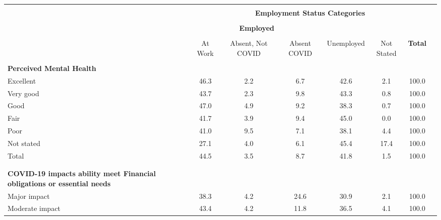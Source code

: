 \begin{tabular*}{\hsize}{ @{\extracolsep{\fill}}l*{7}{c}}
\hline\hline
\\
&\multicolumn{6}{c}{ \textbf{Employment Status Categories} } \\
\cline{2-7} \\
&\multicolumn{3}{c}{ \textbf{Employed} } \\ 
\cline{2-4} \\
 & At Work & Absent, Not COVID & Absent COVID & Unemployed & Not Stated & \textbf{Total} \\
\hline
\\
\hspace{0.25cm}\textbf{Perceived Mental Health} \\
\hspace{0.25cm}Excellent                                          & 46.3 &  2.2 &  6.7 & 42.6 &  2.1 & 100.0\\ 
\hspace{0.25cm}Very good                                          & 43.7 &  2.3 &  9.8 & 43.3 &  0.8 & 100.0\\ 
\hspace{0.25cm}Good                                               & 47.0 &  4.9 &  9.2 & 38.3 &  0.7 & 100.0\\ 
\hspace{0.25cm}Fair                                               & 41.7 &  3.9 &  9.4 & 45.0 &  0.0 & 100.0\\ 
\hspace{0.25cm}Poor                                               & 41.0 &  9.5 &  7.1 & 38.1 &  4.4 & 100.0\\ 
\hspace{0.25cm}Not stated                                         & 27.1 &  4.0 &  6.1 & 45.4 & 17.4 & 100.0\\ 
\hspace{0.25cm}Total                                              & 44.5 &  3.5 &  8.7 & 41.8 &  1.5 & 100.0\\
%
%
\\
\hline
\\
\hspace{0.25cm}\textbf{COVID-19 impacts ability meet Financial obligations or essential needs} \\
\hspace{0.25cm}Major impact                                       & 38.3 &  4.2 & 24.6 & 30.9 &  2.1 & 100.0\\ 
\hspace{0.25cm}Moderate impact                                    & 43.4 &  4.2 & 11.8 & 36.5 &  4.1 & 100.0\\ 

\end{tabular*}
